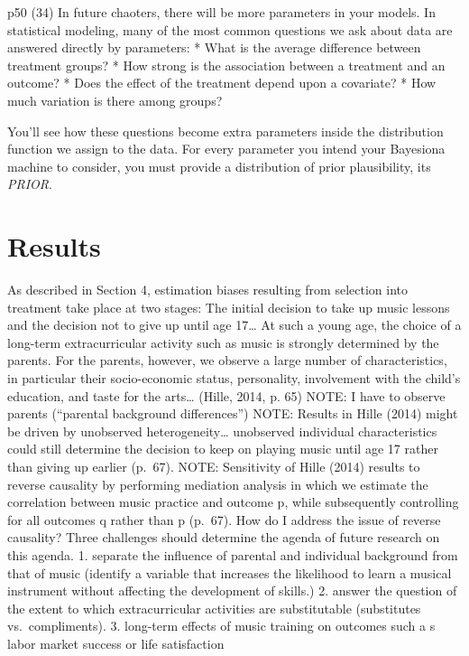 \documentclass[a4, 12pt]{article}
\begin{document}
p50 (34)
In future chaoters, there will be more parameters in your models. In statistical modeling, many of the most common questions we ask about data are answered directly by parameters:
* What is the average difference between treatment groups?
* How strong is the association between a treatment and an outcome?
* Does the effect of the treatment depend upon a covariate?
* How much variation is there among groups?

You'll see how these questions become extra parameters inside the distribution function we assign to the data.
For every parameter you intend your Bayesiona machine to consider, you must provide a distribution of prior plausibility, its \emph{PRIOR}.

\clearpage

\hypertarget{results}{%
\section{Results}\label{results}}

\label{sec:results}

As described in Section 4, estimation biases resulting from selection into treatment take place at two stages: The initial decision to take up music lessons and the decision not to give up until age 17\ldots{} At such a young age, the choice of a long-term extracurricular activity such as music is strongly determined by the parents. For the parents, however, we observe a large number of characteristics, in particular their socio-economic status, personality, involvement with the child's education, and taste for the arts\ldots{} (Hille, 2014, p. 65)
NOTE: I have to observe parents (``parental background differences'')
NOTE: Results in Hille (2014) might be driven by unobserved heterogeneity\ldots{} unobserved individual characteristics could still determine the decision to keep on playing music until age 17 rather than giving up earlier (p.~67).
NOTE: Sensitivity of Hille (2014) results to reverse causality by performing mediation analysis in which we estimate the correlation between music practice and outcome p, while subsequently controlling for all outcomes q rather than p (p.~67). How do I address the issue of reverse causality?
Three challenges should determine the agenda of future research on this agenda.
1. separate the influence of parental and individual background from that of music (identify a variable that increases the likelihood to learn a musical instrument without affecting the development of skills.)
2. answer the question of the extent to which extracurricular activities are substitutable (substitutes vs.~compliments).
3. long-term effects of music training on outcomes such a s labor market success or life satisfaction
\end{document}
